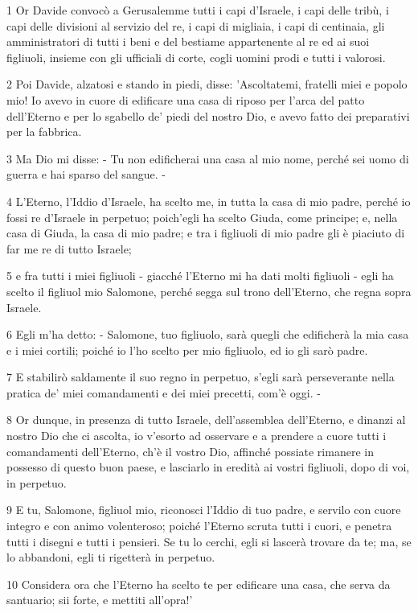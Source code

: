 \par 1 Or Davide convocò a Gerusalemme tutti i capi d'Israele, i capi delle tribù, i capi delle divisioni al servizio del re, i capi di migliaia, i capi di centinaia, gli amministratori di tutti i beni e del bestiame appartenente al re ed ai suoi figliuoli, insieme con gli ufficiali di corte, cogli uomini prodi e tutti i valorosi.
\par 2 Poi Davide, alzatosi e stando in piedi, disse: 'Ascoltatemi, fratelli miei e popolo mio! Io avevo in cuore di edificare una casa di riposo per l'arca del patto dell'Eterno e per lo sgabello de' piedi del nostro Dio, e avevo fatto dei preparativi per la fabbrica.
\par 3 Ma Dio mi disse: - Tu non edificherai una casa al mio nome, perché sei uomo di guerra e hai sparso del sangue. -
\par 4 L'Eterno, l'Iddio d'Israele, ha scelto me, in tutta la casa di mio padre, perché io fossi re d'Israele in perpetuo; poich'egli ha scelto Giuda, come principe; e, nella casa di Giuda, la casa di mio padre; e tra i figliuoli di mio padre gli è piaciuto di far me re di tutto Israele;
\par 5 e fra tutti i miei figliuoli - giacché l'Eterno mi ha dati molti figliuoli - egli ha scelto il figliuol mio Salomone, perché segga sul trono dell'Eterno, che regna sopra Israele.
\par 6 Egli m'ha detto: - Salomone, tuo figliuolo, sarà quegli che edificherà la mia casa e i miei cortili; poiché io l'ho scelto per mio figliuolo, ed io gli sarò padre.
\par 7 E stabilirò saldamente il suo regno in perpetuo, s'egli sarà perseverante nella pratica de' miei comandamenti e dei miei precetti, com'è oggi. -
\par 8 Or dunque, in presenza di tutto Israele, dell'assemblea dell'Eterno, e dinanzi al nostro Dio che ci ascolta, io v'esorto ad osservare e a prendere a cuore tutti i comandamenti dell'Eterno, ch'è il vostro Dio, affinché possiate rimanere in possesso di questo buon paese, e lasciarlo in eredità ai vostri figliuoli, dopo di voi, in perpetuo.
\par 9 E tu, Salomone, figliuol mio, riconosci l'Iddio di tuo padre, e servilo con cuore integro e con animo volenteroso; poiché l'Eterno scruta tutti i cuori, e penetra tutti i disegni e tutti i pensieri. Se tu lo cerchi, egli si lascerà trovare da te; ma, se lo abbandoni, egli ti rigetterà in perpetuo.
\par 10 Considera ora che l'Eterno ha scelto te per edificare una casa, che serva da santuario; sii forte, e mettiti all'opra!'
